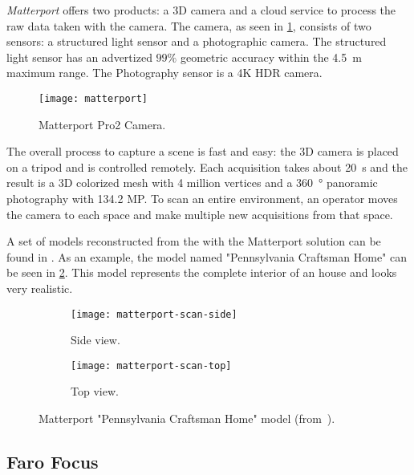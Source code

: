 \emph{Matterport} offers two products: a 3D camera and a cloud service to process the raw data taken with the camera. The camera, as seen in \cref{fig:matterport-camera}, consists of two sensors: a structured light sensor and a photographic camera\cite{matterport}. The structured light sensor has an advertized $99\%$ geometric accuracy within the \SI{4.5}{\meter} maximum range. The Photography sensor is a 4K HDR camera.

\begin{figure}[h]
    
    \centering
    \texttt{[image: matterport]}

    \caption{Matterport Pro2 Camera.}
    \label{fig:matterport-camera}

\end{figure}

The overall process to capture a scene is fast and easy: the 3D camera is placed on a tripod and is controlled remotely. Each acquisition takes about \SI{20}{\second} and the result is a 3D colorized mesh with 4 million vertices and a \SI{360}{\degree} panoramic photography with 134.2 MP. To scan an entire environment, an operator moves the camera to each space and make multiple new acquisitions from that space.

A set of models reconstructed from the with the Matterport solution can be found in \cite{matterport-gallery}. As an example, the model named "Pennsylvania Craftsman Home" \cite{matterport-house} can be seen in \cref{fig:matterport-model}. This model represents the complete interior of an house and looks very realistic.

\begin{figure}[h]
    
    \centering
    \begin{subfigure}{\textwidth}
        \centering
        \texttt{[image: matterport-scan-side]}
        \caption{Side view.}
    \end{subfigure}

    \begin{subfigure}{\textwidth}
        \centering
        \texttt{[image: matterport-scan-top]}
        \caption{Top view.}
    \end{subfigure}

    \caption{Matterport "Pennsylvania Craftsman Home" model (from~\cite{faro-scan}).}
    \label{fig:matterport-model}
\end{figure}

\subsection{Faro Focus}

